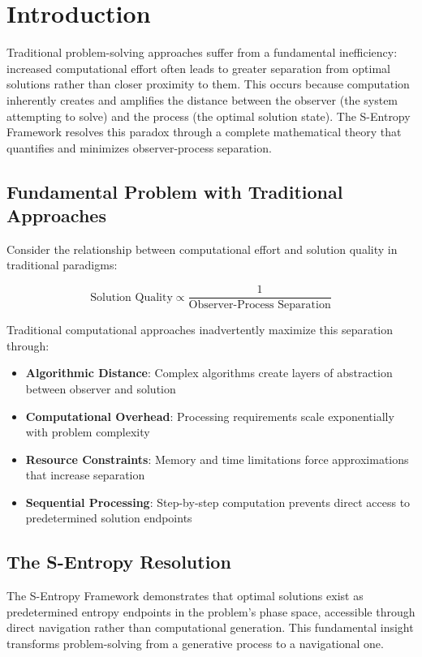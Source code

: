 \documentclass[11pt]{article}
\begin{document}
\section{Introduction}

Traditional problem-solving approaches suffer from a fundamental inefficiency: increased computational effort often leads to greater separation from optimal solutions rather than closer proximity to them. This occurs because computation inherently creates and amplifies the distance between the observer (the system attempting to solve) and the process (the optimal solution state). The S-Entropy Framework resolves this paradox through a complete mathematical theory that quantifies and minimizes observer-process separation.

\subsection{Fundamental Problem with Traditional Approaches}

Consider the relationship between computational effort and solution quality in traditional paradigms:

\begin{equation}
\text{Solution Quality} \propto \frac{1}{\text{Observer-Process Separation}}
\end{equation}

Traditional computational approaches inadvertently maximize this separation through:
\begin{itemize}
\item \textbf{Algorithmic Distance}: Complex algorithms create layers of abstraction between observer and solution
\item \textbf{Computational Overhead}: Processing requirements scale exponentially with problem complexity
\item \textbf{Resource Constraints}: Memory and time limitations force approximations that increase separation
\item \textbf{Sequential Processing}: Step-by-step computation prevents direct access to predetermined solution endpoints
\end{itemize}

\subsection{The S-Entropy Resolution}

The S-Entropy Framework demonstrates that optimal solutions exist as predetermined entropy endpoints in the problem's phase space, accessible through direct navigation rather than computational generation. This fundamental insight transforms problem-solving from a generative process to a navigational one.
\end{document}
